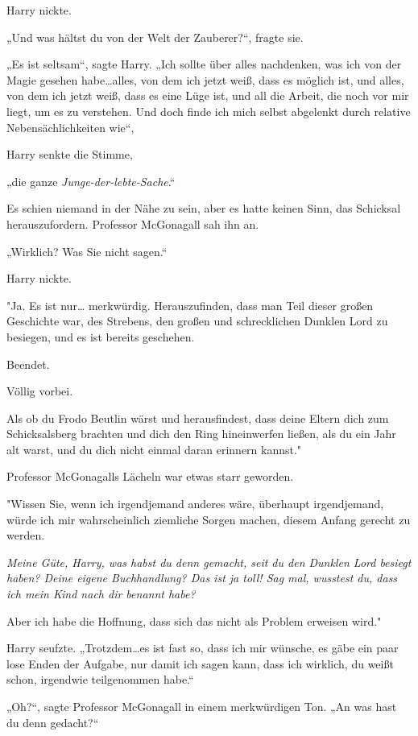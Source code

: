 {Harry nickte.

„Und was hältst du von der Welt der Zauberer?“, fragte sie.

„Es ist seltsam“, sagte Harry. „Ich sollte über alles nachdenken, was ich von der Magie gesehen habe…alles, von dem ich jetzt weiß, dass es möglich ist, und alles, von dem ich jetzt weiß, dass es eine Lüge ist, und all die Arbeit, die noch vor mir liegt, um es zu verstehen. Und doch finde ich mich selbst abgelenkt durch relative Nebensächlichkeiten wie“,

Harry senkte die Stimme,

„die ganze \emph{Junge-der-lebte-Sache}.“

Es schien niemand in der Nähe zu sein, aber es hatte keinen Sinn, das Schicksal herauszufordern. Professor McGonagall sah ihn an.

„Wirklich? Was Sie nicht sagen.“

Harry nickte.

"Ja. Es ist nur… merkwürdig. Herauszufinden, dass man Teil dieser großen Geschichte war, des Strebens, den großen und schrecklichen Dunklen Lord zu besiegen, und es ist bereits geschehen.

Beendet.

Völlig vorbei.

Als ob du Frodo Beutlin wärst und herausfindest, dass deine Eltern dich zum Schicksalsberg brachten und dich den Ring hineinwerfen ließen, als du ein Jahr alt warst, und du dich nicht einmal daran erinnern kannst."

Professor McGonagalls Lächeln war etwas starr geworden.

"Wissen Sie, wenn ich irgendjemand anderes wäre, überhaupt irgendjemand, würde ich mir wahrscheinlich ziemliche Sorgen machen, diesem Anfang gerecht zu werden.

\emph{Meine Güte, Harry, was habst du denn gemacht, seit du den Dunklen Lord besiegt haben? Deine eigene Buchhandlung? Das ist ja toll! Sag mal, wusstest du, dass ich mein Kind nach dir benannt habe?}

Aber ich habe die Hoffnung, dass sich das nicht als Problem erweisen wird."

Harry seufzte. „Trotzdem…es ist fast so, dass ich mir wünsche, es gäbe ein paar lose Enden der Aufgabe, nur damit ich sagen kann, dass ich wirklich, du weißt schon, irgendwie teilgenommen habe.“

„Oh?“, sagte Professor McGonagall in einem merkwürdigen Ton. „An was hast du denn gedacht?“

}
